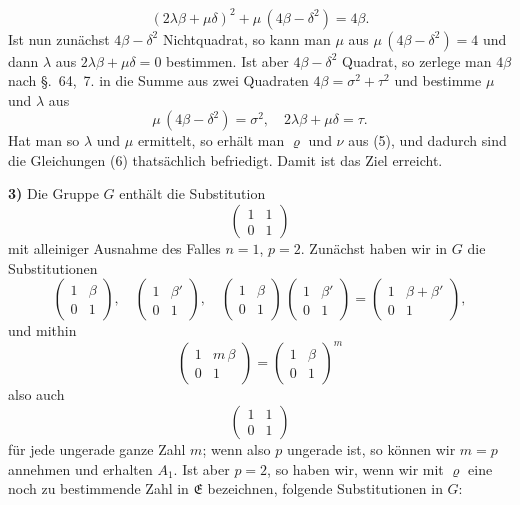 \documentclass[12pt,a4paper]{article}
\begin{document}
\begin{equation}\label{eq:66.7}
\tag{7}
(2\lambda\beta + \mu\delta)^{2} + \mu\,(4\beta - \delta^{2}) = 4\beta.
\end{equation}
Ist nun zunächst $4\beta - \delta^{2}$ Nichtquadrat, so kann man $\mu$ aus $\mu\,(4\beta - \delta^{2}) = 4$ und dann $\lambda$ aus $2\lambda\beta + \mu\delta = 0$ bestimmen. Ist aber $4\beta - \delta^{2}$ Quadrat, so zerlege man $4\beta$ nach \S.~64,~7. in die Summe aus zwei Quadraten $4\beta = \sigma^{2} + \tau^{2}$ und bestimme $\mu$ und $\lambda$ aus
\[
\mu\,(4\beta - \delta^{2}) = \sigma^{2},\quad 2\lambda\beta + \mu\delta = \tau.
\]
Hat man so $\lambda$ und $\mu$ ermittelt, so erhält man $\varrho$ und $\nu$ aus (5), und dadurch sind die Gleichungen (6) thatsächlich befriedigt. Damit ist das Ziel erreicht.

\medskip\noindent
\textbf{3)} Die Gruppe $G$ enthält die Substitution
\[
\begin{pmatrix}1&1\\0&1\end{pmatrix}
\]
mit alleiniger Ausnahme des Falles $n = 1$, $p = 2$. Zunächst haben wir in $G$ die Substitutionen
\[
\begin{pmatrix}1&\beta\\0&1\end{pmatrix},\quad
\begin{pmatrix}1&\beta'\\0&1\end{pmatrix},\quad
\begin{pmatrix}1&\beta\\0&1\end{pmatrix}\,
\begin{pmatrix}1&\beta'\\0&1\end{pmatrix}
= \begin{pmatrix}1&\beta + \beta'\\0&1\end{pmatrix},
\]
und mithin
\[
\begin{pmatrix}1&m\,\beta\\0&1\end{pmatrix}
= \begin{pmatrix}1&\beta\\0&1\end{pmatrix}^{m}
\]
also auch
\[
\begin{pmatrix}1&1\\0&1\end{pmatrix}
\]
für jede ungerade ganze Zahl $m$; wenn also $p$ ungerade ist, so können wir $m = p$ annehmen und erhalten $A_{1}$. Ist aber $p = 2$, so haben wir, wenn wir mit $\varrho$ eine noch zu bestimmende Zahl in $\mathfrak{E}$ bezeichnen, folgende Substitutionen in $G$:
\end{document}

